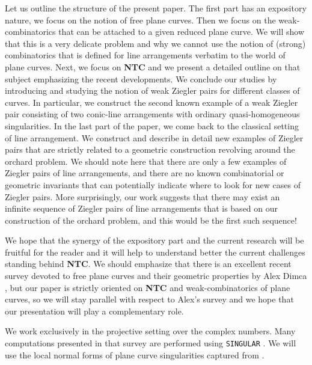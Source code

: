 \documentclass[12pt]{article}
\theoremstyle{plain}
\theoremstyle{definition}
\begin{document}
Let us outline the structure of the present paper. The first part has an expository nature, we focus on the notion of free plane curves. Then we focus on the weak-combinatorics that can be attached to a given reduced plane curve. We will show that this is a very delicate problem and why we cannot use the notion of (strong) combinatorics that is defined for line arrangements verbatim to the world of plane curves. Next, we focus on \textbf{NTC} and we present a detailed outline on that subject emphasizing the recent developments. We conclude our studies by introducing and studying the notion of weak Ziegler pairs for different classes of curves. In particular, we construct the second known example of a weak Ziegler pair consisting of two conic-line arrangements with ordinary quasi-homogeneous singularities. In the last part of the paper, we come back to the classical setting of line arrangement. We construct and describe in detail new examples of Ziegler pairs that are strictly related to a geometric construction revolving around the orchard problem. We should note here that there are only a few examples of Ziegler pairs of line arrangements, and there are no known combinatorial or geometric invariants that can potentially indicate where to look for new cases of Ziegler pairs. More surprisingly, our work suggests that there may exist an infinite sequence of Ziegler pairs of line arrangements that is based on our construction of the orchard problem, and this would be the first such sequence!

We hope that the synergy of the expository part and the current research will be fruitful for the reader and it will help to understand better the current challenges standing behind {\bf NTC}. We should emphasize that there is an excellent recent survey devoted to free plane curves and their geometric properties by Alex Dimca \cite{SurDim}, but our paper is strictly oriented on \textbf{NTC} and weak-combinatorics of plane curves, so we will stay parallel with respect to Alex's survey and we hope that our presentation will play a complementary role.

We work exclusively in the projective setting over the complex numbers. Many computations presented in that survey are performed using \verb}SINGULAR} \cite{Singular}. We will use the local normal forms of plane curve singularities captured from \cite{arnold}.
\end{document}
